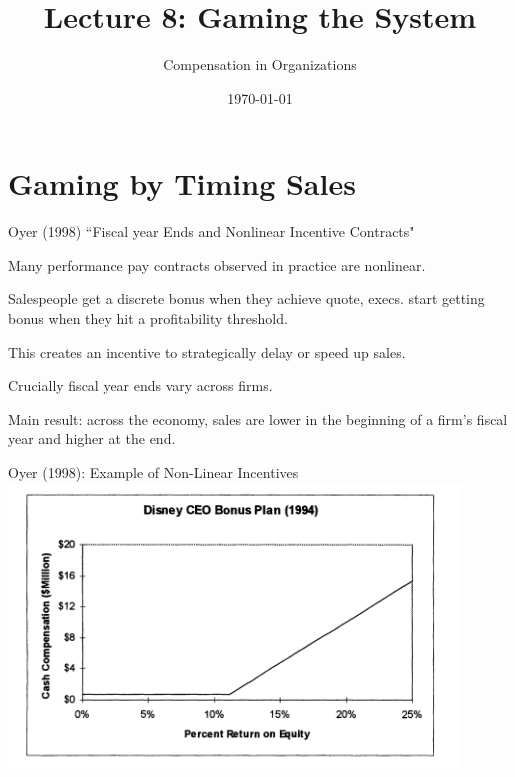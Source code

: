 \documentclass[aspectratio=169,usenames,dvipsnames]{beamer}
\title[diss]{Lecture 8: Gaming the System} %
\author{Compensation in Organizations} %
\institute[shortinst]{Jacob Kohlhepp}
\date{\today} %
\newenvironment{wideitemize}{\itemize\addtolength{\itemsep}{10pt}}{\enditemize}
\begin{document}
\begin{frame}
\titlepage %

\end{frame}

\section{Gaming by Timing Sales}


\begin{frame}{Oyer (1998) ``Fiscal year Ends and Nonlinear Incentive Contracts"}

\begin{wideitemize}
    \item Many performance pay contracts observed in practice are nonlinear.
    \begin{wideitemize}
        \item Salespeople get a discrete bonus when they achieve quote, execs. start getting bonus when they hit a profitability threshold.
    \end{wideitemize}
    \item This creates an incentive to strategically delay or speed up sales.
    \item Crucially fiscal year ends vary across firms.
    \item Main result: across the economy, sales are lower in the beginning of a firm's fiscal year and higher at the end.
\end{wideitemize}
\end{frame}


\begin{frame}[c]{Oyer (1998): Example of Non-Linear Incentives }
\centering
\includegraphics[width=0.9\textwidth]{pictures/oyer_example.png}

\end{frame}
\end{document}
